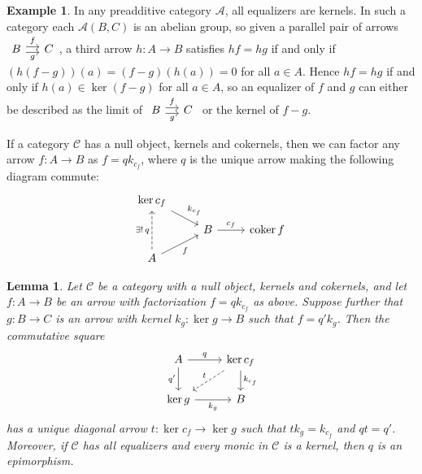 \documentclass[10pt,oneside]{book}
\def\~#1{\mathscr{#1}}
\newcommand{\coker}{\mathop{\mathrm{coker}}}
\theoremstyle{plain}
\newtheorem{lem}[thm]{Lemma}
\theoremstyle{definition}
\newtheorem{ex}[thm]{Example}
\theoremstyle{remark}
\numberwithin{equation}{section}
\numberwithin{figure}{section}
\begin{document}
\begin{ex}
    In any preadditive category $\~A$, all equalizers are kernels. In such a category each $\~A(B, C)$ is an abelian group, so given a parallel pair of arrows $\begin{tikzcd}[column sep = small]
        B & C
        \arrow["g"', shift right, from=1-1, to=1-2]
        \arrow["f", shift left, from=1-1, to=1-2]
    \end{tikzcd}$, a third arrow $h: A \to B$ satisfies $hf = hg$ if and only if $(h(f - g))(a) = (f - g)(h(a)) = 0$ for all $a \in A$. Hence $hf = hg$ if and only if $h(a) \in \ker(f - g)$ for all $a \in A$, so an equalizer of $f$ and $g$ can either be described as the limit of $\begin{tikzcd}[column sep = small]
        B & C
        \arrow["g"', shift right, from=1-1, to=1-2]
        \arrow["f", shift left, from=1-1, to=1-2]
    \end{tikzcd}$ or the kernel of $f - g$. 
\end{ex}

If a category $\~C$ has a null object, kernels and cokernels, then we can factor any arrow $f: A \to B$ as $f = qk_{c_f}$, where $q$ is the unique arrow making the following diagram commute:
\[\begin{tikzcd}[row sep = small]
    {\ker c_f} \\
    & B & {\coker f} \\
    A
    \arrow["{k_{c_f}}", from=1-1, to=2-2]
    \arrow["{c_f}", from=2-2, to=2-3]
    \arrow["{\exists ! \, q}", dashed, from=3-1, to=1-1]
    \arrow["f"', from=3-1, to=2-2]
\end{tikzcd}\]


\begin{lem}
Let $\~C$ be a category with a null object, kernels and cokernels, and let $f: A \to B$ be an arrow with factorization $f = qk_{c_f}$ as above. Suppose further that $g: B \to C$ is an arrow with kernel $k_g: \ker g \to B$ such that $f = q' k_g$. Then the commutative square
\begin{equation}
\label{eq:kernel_square}
\begin{tikzcd}
    A & {\ker c_f} \\
    {\ker g} & B
    \arrow["q", from=1-1, to=1-2]
    \arrow["{q'}"', from=1-1, to=2-1]
    \arrow["t"', dashed, from=1-2, to=2-1]
    \arrow["{k_{c_f}}", from=1-2, to=2-2]
    \arrow["{k_g}"', from=2-1, to=2-2]
\end{tikzcd}
\end{equation}
has a unique diagonal arrow $t: \ker c_f \to \ker g$ such that $tk_g = k_{c_f}$ and $qt = q'$. Moreover, if $\~C$ has all equalizers and every monic in $\~C$ is a kernel, then $q$ is an epimorphism.
\end{lem}
\end{document}
